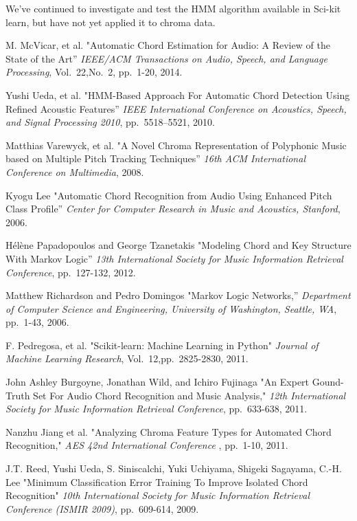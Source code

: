 \documentclass{article}
\begin{document}
We've continued to investigate and test the HMM algorithm available in Sci-kit learn, but have not
yet applied it to chroma data.

\begin{thebibliography}{citations}

M. McVicar, et al.
"Automatic Chord Estimation for Audio: A Review of the State of the Art''
{\it IEEE/ACM Transactions on Audio, Speech, and Language Processing},
Vol.~22,No.~2, pp.~1-20, 2014.

Yushi Ueda, et al.
"HMM-Based Approach For Automatic Chord Detection Using Refined Acoustic
Features''
{\it IEEE International Conference on Acoustics, Speech, and Signal Processing 2010},
pp.~5518--5521, 2010.

Matthias Varewyck, et al.
"A Novel Chroma Representation of Polyphonic Music based on Multiple Pitch
Tracking Techniques''
{\it 16th ACM International Conference on Multimedia},
2008.

Kyogu Lee
"Automatic Chord Recognition from Audio Using Enhanced Pitch Class Profile''
{\it Center for Computer Research in Music and Acoustics, Stanford},
2006.

Hélène Papadopoulos and George Tzanetakis
"Modeling Chord and Key Structure With Markov Logic''
{\it 13th International Society for Music Information Retrieval Conference},
pp.~127-132, 2012.

Matthew Richardson and Pedro Domingos
"Markov Logic Networks,''
{\it Department of Computer Science and Engineering, University of Washington, Seattle, WA},
pp.~1-43, 2006.

F. Pedregosa, et al.
"Scikit-learn: Machine Learning in Python"
{\it Journal of Machine Learning Research},
Vol.~12,pp.~2825-2830, 2011.

John Ashley Burgoyne, Jonathan Wild, and Ichiro Fujinaga
"An Expert Gound-Truth Set For Audio Chord Recognition and Music Analysis,"
{\it 12th International Society for Music Information Retrieval Conference},
pp.~633-638, 2011.

Nanzhu Jiang et al.
"Analyzing Chroma Feature Types for Automated Chord Recognition,"
{\it AES 42nd International Conference },
pp.~1-10, 2011.

J.T. Reed, Yushi Ueda, S. Siniscalchi, Yuki Uchiyama, Shigeki Sagayama, C.-H. Lee
"Minimum Classification Error Training To Improve Isolated Chord Recognition"
{\it 10th International Society for Music Information Retrieval Conference (ISMIR 2009)},
pp.~609-614, 2009.


\end{thebibliography}
\end{document}
